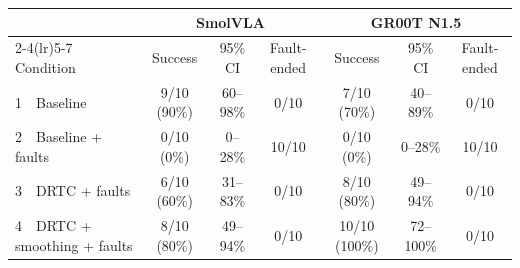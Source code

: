 \begin{tabular}{l ccc ccc}
\toprule
 & \multicolumn{3}{c}{SmolVLA} & \multicolumn{3}{c}{GR00T N1.5} \\
\cmidrule(lr){2-4}\cmidrule(lr){5-7}
Condition & Success & 95\% CI & Fault-ended & Success & 95\% CI & Fault-ended \\
\midrule
1~~Baseline & 9/10 (90\%) & 60--98\% & 0/10 & 7/10 (70\%) & 40--89\% & 0/10 \\
2~~Baseline + faults & 0/10 (0\%) & 0--28\% & 10/10 & 0/10 (0\%) & 0--28\% & 10/10 \\
3~~DRTC + faults & 6/10 (60\%) & 31--83\% & 0/10 & 8/10 (80\%) & 49--94\% & 0/10 \\
4~~DRTC + smoothing + faults & 8/10 (80\%) & 49--94\% & 0/10 & 10/10 (100\%) & 72--100\% & 0/10 \\
\bottomrule
\end{tabular}
